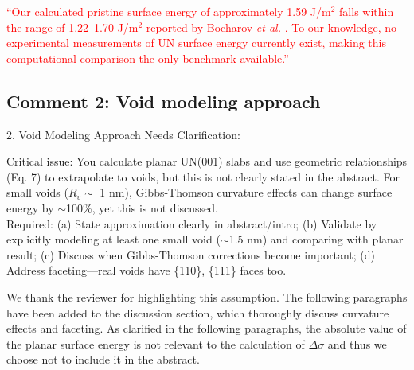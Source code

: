 \documentclass[12pt]{article}
\begin{document}
\textcolor{red}{``Our calculated pristine surface energy of approximately 1.59 J/m$^2$ falls within the range of 1.22--1.70 J/m$^2$ reported by Bocharov \textit{et al.} \cite{Bocharov2011SS}. To our knowledge, no experimental measurements of UN surface energy currently exist, making this computational comparison the only benchmark available.''}

\subsection*{Comment 2: Void modeling approach}

\color{blue}

2. Void Modeling Approach Needs Clarification:

Critical issue: You calculate planar UN(001) slabs and use geometric relationships (Eq. 7) to extrapolate to voids, but this is not clearly stated in the abstract. For small voids ($R_v \sim$ 1 nm), Gibbs-Thomson curvature effects can change surface energy by $\sim$100\%, yet this is not discussed.
\\

Required: (a) State approximation clearly in abstract/intro; (b) Validate by explicitly modeling at least one small void ($\sim$1.5 nm) and comparing with planar result; (c) Discuss when Gibbs-Thomson corrections become important; (d) Address faceting---real voids have \{110\}, \{111\} faces too.
\\

\color{black}


We thank the reviewer for highlighting this assumption. The following paragraphs have been added to the discussion section, which thoroughly discuss curvature effects and faceting. As clarified in the following paragraphs, the absolute value of the planar surface energy is not relevant to the calculation of $\Delta \sigma$ and thus we choose not to include it in the abstract.
\\


\color{red}
\end{document}
